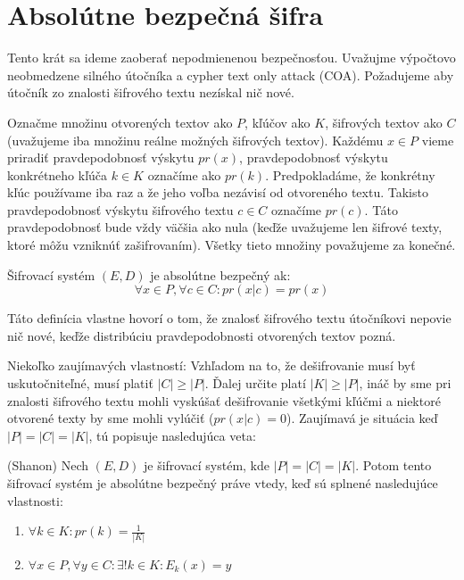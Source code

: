 \section{Absolútne bezpečná šifra}

Tento krát sa ideme zaoberať nepodmienenou bezpečnosťou. Uvažujme 
výpočtovo neobmedzene silného útočníka a cypher text only attack (COA).
Požadujeme aby útočník zo znalosti šifrového textu nezískal nič nové.

Označme množinu otvorených textov ako $P$, kľúčov ako $K$, šifrových textov ako $C$
(uvažujeme iba množinu reálne možných šifrových textov). Každému $x \in P$ vieme priradiť
pravdepodobnosť výskytu $pr(x)$, pravdepodobnosť
výskytu konkrétneho kľúča $k \in K$ označíme ako $pr(k)$. Predpokladáme, že
konkrétny kľúc používame iba raz a že jeho voľba nezávisí od otvoreného textu.
Takisto pravdepodobnosť výskytu šifrového textu $c \in C$ označíme $pr(c)$. Táto pravdepodobnosť
bude vždy väčšia ako nula (keďže uvažujeme len šifrové texty, ktoré môžu vzniknúť zašifrovaním).
Všetky tieto množiny považujeme za konečné.

\begin{definicia}
    Šifrovací systém $(E,D)$ je absolútne bezpečný ak:
    $$\forall x \in P, \forall c \in C\colon pr(x | c) = pr(x)$$
\end{definicia}
\begin{komentar}
    Táto definícia vlastne hovorí o tom, že znalosť šifrového textu útočníkovi nepovie nič
    nové, keďže distribúciu pravdepodobnosti otvorených textov pozná.
\end{komentar}

Niekoľko zaujímavých vlastností:
Vzhľadom na to, že dešifrovanie musí byť uskutočniteľné, musí platiť $|C| \geq |P|$.
Ďalej určite platí $|K| \geq |P|$, ináč by sme pri znalosti šifrového textu mohli 
vyskúšať dešifrovanie všetkými kľúčmi a niektoré otvorené texty by sme mohli vylúčiť
($pr(x|c) = 0$). Zaujímavá je situácia keď $|P| = |C| = |K|$, tú popisuje nasledujúca veta:

\begin{veta}{(Shanon)}
    Nech $(E,D)$ je šifrovací systém, kde $|P|=|C|=|K|$. Potom tento šifrovací systém je
    absolútne bezpečný práve vtedy, keď sú splnené nasledujúce vlastnosti:
    \begin{enumerate}
        \item $\forall k \in K\colon pr(k) = \frac{1}{|K|}$
        \item $\forall x \in P, \forall y \in C: \exists! k \in K\colon E_k(x) = y$
    \end{enumerate}
\end{veta}

